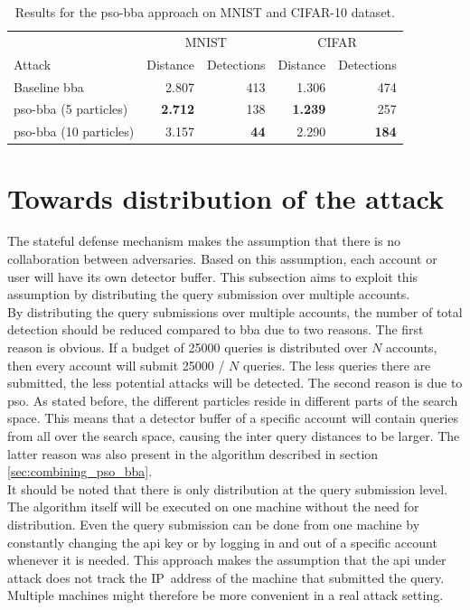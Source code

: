 \begin{table}
	\centering
	\caption[PSO-BBA results]{Results for the \gls{pso}-\gls{bba} approach on MNIST and CIFAR-10 dataset.}
	\label{tbl:pso_bba}
	\begin{tabular}{lrrrr}\toprule
			& \multicolumn{2}{c}{MNIST} &\multicolumn{2}{c}{CIFAR} \\ \cmidrule(r){2-3} \cmidrule(r){4-5}
	Attack				&Distance	&Detections	&Distance	&Detections \\ \midrule
	Baseline \gls{bba}	&2.807		&413		&1.306			&474 \\
	\gls{pso}-\gls{bba} (5 particles)	&\textbf{2.712}			&138			&\textbf{1.239}				&257 \\ 
	\gls{pso}-\gls{bba} (10 particles)	&3.157			&\textbf{44}			&2.290				&\textbf{184} \\
	
	\bottomrule
	
	\end{tabular}
\end{table}

\section{Towards distribution of the attack}\label{sec:distribution}
The stateful defense mechanism \cite{chen_stateful_2019} makes the assumption that there is no collaboration between adversaries. Based on this assumption, each account or user will have its own detector buffer. This subsection aims to exploit this assumption by distributing the query submission over multiple accounts.\\

By distributing the query submissions over multiple accounts, the number of total detection should be reduced compared to \gls{bba} due to two reasons. The first reason is obvious. If a budget of \num{25000} queries is distributed over $N$ accounts, then every account will submit \num{25000} / $N$ queries. The less queries there are submitted, the less potential attacks will be detected. The second reason is due to \gls{pso}. As stated before, the different particles reside in different parts of the search space. This means that a detector buffer of a specific account will contain queries from all over the search space, causing the inter query distances to be larger. The latter reason was also present in the algorithm described in section \ref{sec:combining_pso_bba}.\\

It should be noted that there is only distribution at the query submission level. The algorithm itself will be executed on one machine without the need for distribution. Even the query submission can be done from one machine by constantly changing the \gls{api} key or by logging in and out of a specific account whenever it is needed. This approach makes the assumption that the \gls{api} under attack does not track the IP~address of the machine that submitted the query. Multiple machines might therefore be more convenient in a real attack setting.\\

